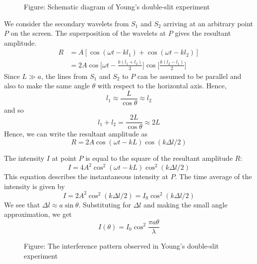 \documentclass[../../../main.tex]{subfiles}
\begin{document}
\begin{figure}[h]
    \centering
    \caption*{Figure: Schematic diagram of Young's double-slit experiment}
\end{figure}

We consider the secondary wavelets from $S_1$ and $S_2$ arriving at an arbitrary point $P$ on the screen. The superposition of the wavelets at $P$ gives the resultant amplitude. 
\begin{align*}
    R &= A[\cos(\omega t - kl_1) + \cos(\omega t - kl_2)]\\
    &=2A\cos\bigg[\omega t-\frac{k(l_1+l_2)}{2}\bigg] \cos \bigg[\frac{k(l_2-l_1)}{2}\bigg]
\end{align*}
Since $L \gg a$, the lines from $S_1$ and $S_2$ to $P$ can be assumed to be parallel and also to make the same angle $\theta$ with respect to the horizontal axis. Hence,
\begin{equation*}
    l_1\approx\frac{L}{\cos \theta}\approx l_2
\end{equation*}
and so 
\begin{equation*}
    l_1+l_2=\frac{2L}{\cos \theta}\approx2L
\end{equation*}
Hence, we can write the resultant amplitude as
\begin{equation*}
    R= 2A\cos (\omega t -kL) \cos (k\Delta l/2)
\end{equation*}

The intensity $I$ at point $P$ is equal to the square of the resultant amplitude $R$:
\begin{equation*}
    I=4A^2\cos^2 (\omega t -kL) \cos^2 (k\Delta l/2)
\end{equation*}
This equation describes the instantaneous intensity at $P $. The time average of the intensity is given by
\begin{equation*}
    I=2A^2\cos^2 (k\Delta l/2)=I_0\cos^2 (k\Delta l/2)
\end{equation*}
We see that $\Delta l\approx a\sin \theta$. Substituting for $\Delta l$ and making the small angle approximation, we get 
\begin{equation*}
    I(\theta)=I_0\cos^2  \frac{\pi a \theta}{\lambda}
\end{equation*}
\begin{figure}
    \centering
    \caption*{Figure: The interference pattern observed in Young's double-slit experiment} 
\end{figure}
\end{document}
